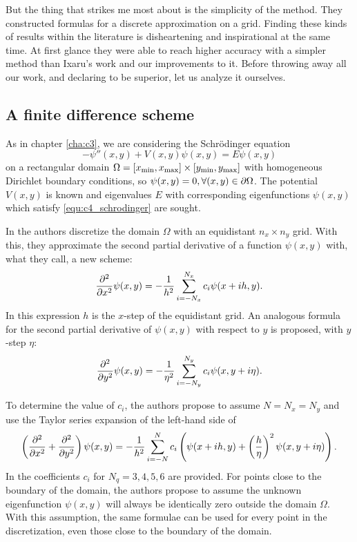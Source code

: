 But the thing that strikes me most about \cite{wang_new_2009} is the simplicity of the method. They constructed formulas for a discrete approximation on a grid. Finding these kinds of results within the literature is disheartening and inspirational at the same time. At first glance they were able to reach higher accuracy with a simpler method than Ixaru's work \cite{ixaru_new_2010} and our improvements \cite{baeyens_improvements_2022} to it. Before throwing away all our work, and declaring \cite{wang_new_2009} to be superior, let us analyze it ourselves.

\subsection{A finite difference scheme}\label{sec:c4_fd_scheme}

As in chapter \ref{cha:c3}, we are considering the Schrödinger equation
\begin{equation}\label{equ:c4_schrodinger}
    -\psi''(x, y) + V(x, y) \psi(x, y) = E\psi(x, y)
\end{equation}
on a rectangular domain $\Omega = [{x_{\text{min}}}, {x_{\text{max}}}] \times [{y_{\text{min}}}, {y_{\text{max}}}]$ with homogeneous Dirichlet boundary conditions, so $\psi(x, y) = 0, \forall (x, y) \in \partial\Omega$. The potential $V(x, y)$ is known and eigenvalues $E$ with corresponding eigenfunctions $\psi(x, y)$ which satisfy \eqref{equ:c4_schrodinger} are sought.

In \cite{wang_new_2009} the authors discretize the domain $\Omega$ with an equidistant $n_x \times n_y$ grid. With this, they approximate the second partial derivative of a function $\psi(x, y)$ with, what they call, a new scheme:
$$
    {\pdv[2]{}{x}}\psi(x, y) = -\frac{1}{h^2}\sum_{i=-N_x}^{N_x} c_i \psi(x + ih, y)\text{.}
$$
In this expression $h$ is the $x$-step of the equidistant grid. An analogous formula for the second partial derivative of $\psi(x, y)$ with respect to $y$ is proposed, with $y$-step $\eta$:
$$
    {\pdv[2]{}{y}}\psi(x, y) = -\frac{1}{\eta^2}\sum_{i=-N_y}^{N_y} c_i \psi(x, y + i\eta)\text{.}
$$

To determine the value of $c_i$, the authors propose to assume $N = N_x = N_y$ and use the Taylor series expansion of the left-hand side of
$$
    \left({\pdv[2]{}{x}} + {\pdv[2]{}{y}}\right)\psi(x, y) = -\frac{1}{h^2} \sum_{i=-N}^{N} c_i \left(\psi(x+ih, y) + \left(\frac{h}{\eta}\right)^2\psi(x, y+i\eta)\right)\text{.}
$$
In \cite{wang_new_2009} the coefficients $c_i$ for $N_q = 3, 4, 5, 6$ are provided. For points close to the boundary of the domain, the authors propose to assume the unknown eigenfunction $\psi(x, y)$ will always be identically zero outside the domain $\Omega$. With this assumption, the same formulae can be used for every point in the discretization, even those close to the boundary of the domain.

